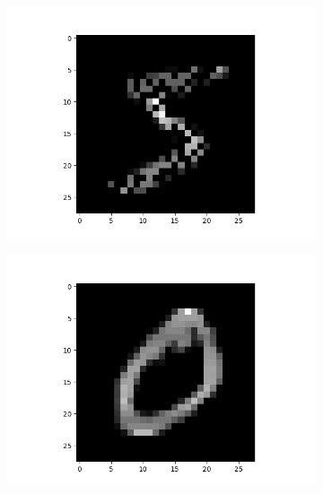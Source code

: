 \documentclass[12pt,a4paper]{article}
\begin{document}
\begin{enumerate}
\begin{enumerate}
\begin{figure}[H]
\begin{subfigure}{0.5\textwidth}
                                \end{subfigure}
                                \begin{subfigure}{0.5\textwidth}
                                    \raggedleft
                                    \includegraphics[width=\textwidth]{images/im0.png}
                                \end{subfigure}
                            \end{figure}
                            \begin{figure}[H]
                                \begin{subfigure}{0.5\textwidth}
                                    \raggedleft
                                    \includegraphics[width=\textwidth]{images/im3.png}

\end{subfigure}
\end{figure}
\end{enumerate}
\end{enumerate}
\end{document}
